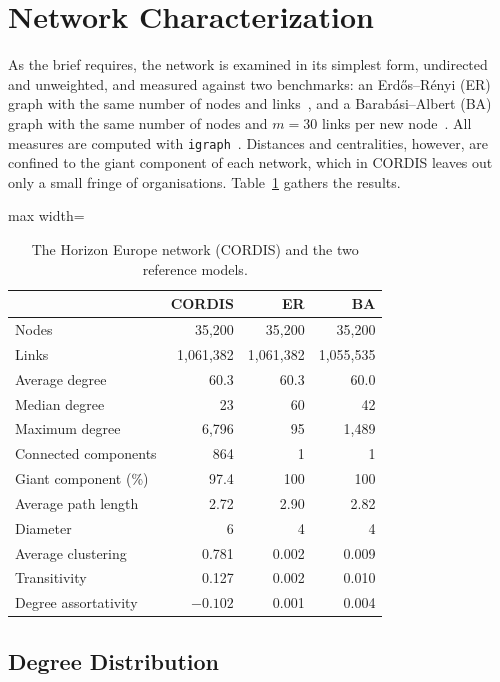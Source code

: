 \documentclass[sigchi]{acmart}
\begin{document}
\section{Network Characterization}
\label{sec:analysis}

As the brief requires, the network is examined in its simplest form, undirected and unweighted, and measured against two benchmarks: an Erd\H{o}s--R\'enyi (ER) graph with the same number of nodes and links~\cite{erdos1959}, and a Barab\'asi--Albert (BA) graph with the same number of nodes and $m = 30$ links per new node~\cite{barabasi1999}. All measures are computed with \texttt{igraph}~\cite{igraph}. Distances and centralities, however, are confined to the giant component of each network, which in CORDIS leaves out only a small fringe of organisations. Table~\ref{tab:summary} gathers the results.

\begin{table}[t]
\caption{The Horizon Europe network (CORDIS) and the two reference models.}
\label{tab:summary}
\small
\setlength{\tabcolsep}{4pt}
\begin{adjustbox}{max width=\columnwidth}
\begin{tabular}{lrrr}
\toprule
 & CORDIS & ER & BA \\
\midrule
Nodes & 35,200 & 35,200 & 35,200 \\
Links & 1,061,382 & 1,061,382 & 1,055,535 \\
Average degree & 60.3 & 60.3 & 60.0 \\
Median degree & 23 & 60 & 42 \\
Maximum degree & 6,796 & 95 & 1,489 \\
Connected components & 864 & 1 & 1 \\
Giant component (\%) & 97.4 & 100 & 100 \\
Average path length & 2.72 & 2.90 & 2.82 \\
Diameter & 6 & 4 & 4 \\
Average clustering & 0.781 & 0.002 & 0.009 \\
Transitivity & 0.127 & 0.002 & 0.010 \\
Degree assortativity & $-0.102$ & 0.001 & 0.004 \\
\bottomrule
\end{tabular}
\end{adjustbox}
\end{table}

\subsection{Degree Distribution}
\end{document}
